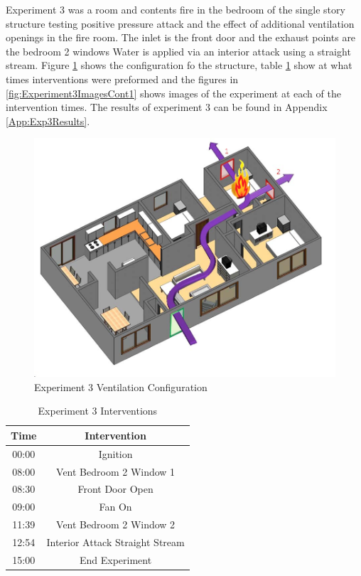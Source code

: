 \documentclass{article}
\begin{document}
Experiment 3 was a room and contents fire in the bedroom of the single story structure testing positive pressure attack and the effect of additional ventilation openings in the fire room. The inlet is the front door and the exhaust points are the bedroom 2 windows Water is applied via an interior attack using a straight stream. Figure \ref{fig:Exp3VentConfig} shows the configuration fo the structure, table \ref{Table:Exp3Interventions} show at what times interventions were preformed and the figures in \ref{fig:Experiment3ImagesCont1} shows images of the experiment at each of the intervention times. The results of experiment 3 can be found in Appendix \ref{App:Exp3Results}.

\begin{figure}[h!]
	\centering
	\includegraphics[width=5in]{0_Images/FireExperiments/Single_Story/Experiment_3.jpg}
	\caption{Experiment 3 Ventilation Configuration}
	\label{fig:Exp3VentConfig}
\end{figure}

\begin{table}[H]
	\centering
	\caption{Experiment 3 Interventions}
	\begin{tabular}{|c|c|} 
		\hline
		Time & Intervention \\ \hline \hline
		00:00 & Ignition \\ \hline
		08:00 & Vent Bedroom 2 Window 1 \\ \hline
		08:30 & Front Door Open \\ \hline
		09:00 & Fan On \\ \hline
		11:39 & Vent Bedroom 2 Window 2 \\ \hline
		12:54 & Interior Attack Straight Stream \\ \hline
		15:00 & End Experiment \\ \hline
	\end{tabular}
	\label{Table:Exp3Interventions}
\end{table}
\end{document}
